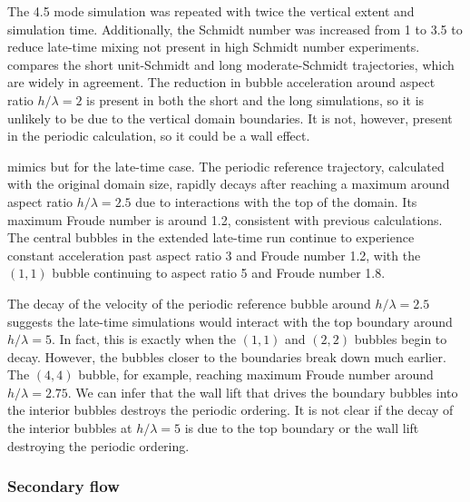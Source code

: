 The 4.5 mode simulation was repeated with twice the vertical extent and simulation time.
Additionally, the Schmidt number was increased from 1 to 3.5 to reduce late-time mixing not present in high Schmidt number experiments.
 compares the short unit-Schmidt and long moderate-Schmidt trajectories, which are widely in agreement.
The reduction in bubble acceleration around aspect ratio $h/\lambda = 2$ is present in both the short and the long simulations, so it is unlikely to be due to the vertical domain boundaries.
It is not, however, present in the periodic calculation, so it could be a wall effect.

 mimics  but for the late-time case.
The periodic reference trajectory, calculated with the original domain size, rapidly decays after reaching a maximum around aspect ratio $h/\lambda = 2.5$ due to interactions with the top of the domain.
Its maximum Froude number is around 1.2, consistent with previous calculations.
The central bubbles in the extended late-time run continue to experience constant acceleration past aspect ratio 3 and Froude number 1.2, with the $(1,1)$ bubble continuing to aspect ratio 5 and Froude number 1.8.

The decay of the velocity of the periodic reference bubble around $h/\lambda = 2.5$ suggests the late-time simulations would interact with the top boundary around $h/\lambda = 5$.
In fact, this is exactly when the $(1,1)$ and $(2,2)$ bubbles begin to decay.
However, the bubbles closer to the boundaries break down much earlier.
The $(4,4)$ bubble, for example, reaching maximum Froude number around $h/\lambda = 2.75$.
We can infer that the wall lift that drives the boundary bubbles into the interior bubbles destroys the periodic ordering.
It is not clear if the decay of the interior bubbles at $h/\lambda = 5$ is due to the top boundary or the wall lift destroying the periodic ordering.

\subsubsection{Secondary flow}

